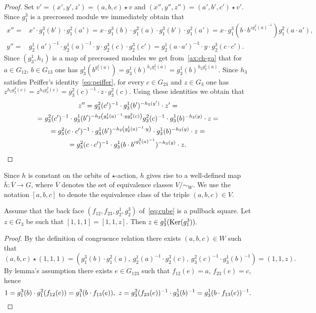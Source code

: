 \begin{proof}
    Set $v'=(x', y', z') = (a, b, c) \star v$ and $(x'', y'', z'') = (a', b', c') \star v'$.
    Since $g_1^3$ is a precrossed module we immediately obtain that
    \begin{align*}
        x'' =& x' \cdot g_1^3(b') \cdot g_1^2(a') = x \cdot g_1^3(b) \cdot g_1^2(a) \cdot g_1^3(b') \cdot g_1^2(a') = x \cdot g_1^3(b \cdot b'^{g_1^2(a)^{-1}}) g_1^2(a \cdot a'),\\
        y'' =& g_2^1(a')^{-1} \cdot g_2^1(a)^{-1} \cdot y \cdot g_2^3(c) \cdot g_2^3(c') = g_2^1(a\cdot a')^{-1} \cdot y \cdot g_2^{3}(c\cdot c'). \end{align*}
    Since $(g_3^1, h_1)$ is a map of precrossed modules we get from~\eqref{ax:ch-ga} that for $a \in G_{12}$, $b \in G_{13}$ one has $g_3^1(b^{g_1^2(a)}) = g_3^1(b)^{h_1 g_1^2(a)} = g_3^1(b)^{h_2g_2^1(a)}$.
    Since $h_3$ satisfies Peiffer's identity~\eqref{eq:peiffer}, for every $c \in G_{23}$ and $z \in G_3$ one has $z ^{h_2 g_2^3(c)} = z^{ h_3 g_3^2(c)} = g_3^2(c)^{-1} \cdot z \cdot g_3^2(c)$.
    Using these identities we obtain that
    \begin{multline*}
        z'' = g_3^2(c')^{-1} \cdot g_3^1(b')^{-h_2(y')} \cdot z' = \\
        = g_3^2(c')^{-1} \cdot g_3^1(b')^{- h_2 \left( g_2^1(a)^{-1} \cdot y g_2^3(c) \right)} g_3^2(c)^{-1} \cdot g_3^1(b)^{-h_2(y)} \cdot z = \\
        = g_3^2(c \cdot c')^{-1} \cdot g_3^1(b')^{- h_2 \left( g_2^1(a)^{-1} \cdot y \right)} \cdot g_3^1(b)^{-h_2(y)} \cdot z = \\
        = g_3^2(c \cdot c')^{-1} \cdot g_3^1(b \cdot {b'} ^ {g_1^2(a)^{-1}})^{- h_2 \left( y \right)} \cdot z. \qedhere
    \end{multline*}
\end{proof}
Since $h$ is constant on the orbits of $\star$-action, $h$ gives rise to a well-defined map $\overline{h} \colon \overline{V} \to G$,
 where $\overline{V}$ denotes the set of equivalence classes $V/\sim_W.$
We use the notation $[a, b, c]$ to denote the equivalence class of the triple $(a, b, c) \in V$.

\begin{lemma}\label{lem:one-one-z} Assume that the back face $(f_{12}, f_{23}, g_2^1, g_2^3)$ of~\eqref{eq:cube} is a pullback square.
Let $z \in G_3$ be such that $[1, 1, 1] = [1, 1, z]$.
Then $z \in g_3^1(\operatorname{Ker}(g_1^3)).$ \end{lemma}
\begin{proof} By the definition of congruence relation there exists $(a, b, c)\in W$ such that
\[ (a, b, c) \star (1, 1, 1) = ( g_1^3(b) \cdot g_1^2(a),\ g_2^1(a)^{-1} \cdot g_2^3(c),\ g_3^2(c)^{-1} \cdot g_3^1(b)^{-1}) = (1,1,z). \]
By lemma's assumption there exists $e \in G_{123}$ such that $f_{12}(e) = a$, $f_{23}(e) = c$, hence
\[ 1 = g_1^3(b) \cdot g_1^2(f_{12}(e)) = g_1^3(b \cdot f_{13}(e)),\ z = g_3^2(f_{23}(e))^{-1} \cdot g_3^1(b)^{-1} = g_3^1(b \cdot f_{13}(e))^{-1}. \qedhere\] \end{proof}


